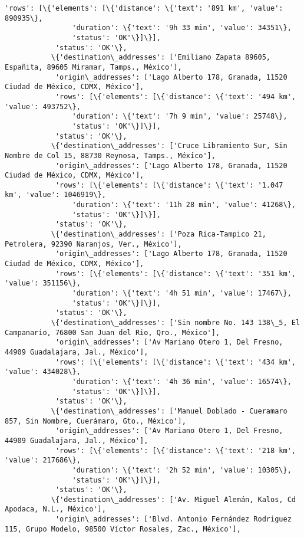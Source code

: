 \documentclass[11pt]{article}
\begin{document}
\begin{Verbatim}[commandchars=\\\{\}]
            'rows': [\{'elements': [\{'distance': \{'text': '891 km', 'value': 890935\},
                'duration': \{'text': '9h 33 min', 'value': 34351\},
                'status': 'OK'\}]\}],
            'status': 'OK'\},
           \{'destination\_addresses': ['Emiliano Zapata 89605, Españita, 89605 Miramar, Tamps., México'],
            'origin\_addresses': ['Lago Alberto 178, Granada, 11520 Ciudad de México, CDMX, México'],
            'rows': [\{'elements': [\{'distance': \{'text': '494 km', 'value': 493752\},
                'duration': \{'text': '7h 9 min', 'value': 25748\},
                'status': 'OK'\}]\}],
            'status': 'OK'\},
           \{'destination\_addresses': ['Cruce Libramiento Sur, Sin Nombre de Col 15, 88730 Reynosa, Tamps., México'],
            'origin\_addresses': ['Lago Alberto 178, Granada, 11520 Ciudad de México, CDMX, México'],
            'rows': [\{'elements': [\{'distance': \{'text': '1.047 km', 'value': 1046919\},
                'duration': \{'text': '11h 28 min', 'value': 41268\},
                'status': 'OK'\}]\}],
            'status': 'OK'\},
           \{'destination\_addresses': ['Poza Rica-Tampico 21, Petrolera, 92390 Naranjos, Ver., México'],
            'origin\_addresses': ['Lago Alberto 178, Granada, 11520 Ciudad de México, CDMX, México'],
            'rows': [\{'elements': [\{'distance': \{'text': '351 km', 'value': 351156\},
                'duration': \{'text': '4h 51 min', 'value': 17467\},
                'status': 'OK'\}]\}],
            'status': 'OK'\},
           \{'destination\_addresses': ['Sin nombre No. 143 138\_5, El Campanario, 76800 San Juan del Rio, Qro., México'],
            'origin\_addresses': ['Av Mariano Otero 1, Del Fresno, 44909 Guadalajara, Jal., México'],
            'rows': [\{'elements': [\{'distance': \{'text': '434 km', 'value': 434028\},
                'duration': \{'text': '4h 36 min', 'value': 16574\},
                'status': 'OK'\}]\}],
            'status': 'OK'\},
           \{'destination\_addresses': ['Manuel Doblado - Cueramaro 857, Sin Nombre, Cuerámaro, Gto., México'],
            'origin\_addresses': ['Av Mariano Otero 1, Del Fresno, 44909 Guadalajara, Jal., México'],
            'rows': [\{'elements': [\{'distance': \{'text': '218 km', 'value': 217686\},
                'duration': \{'text': '2h 52 min', 'value': 10305\},
                'status': 'OK'\}]\}],
            'status': 'OK'\},
           \{'destination\_addresses': ['Av. Miguel Alemán, Kalos, Cd Apodaca, N.L., México'],
            'origin\_addresses': ['Blvd. Antonio Fernández Rodriguez 115, Grupo Modelo, 98500 Víctor Rosales, Zac., México'],

\end{Verbatim}
\end{document}
